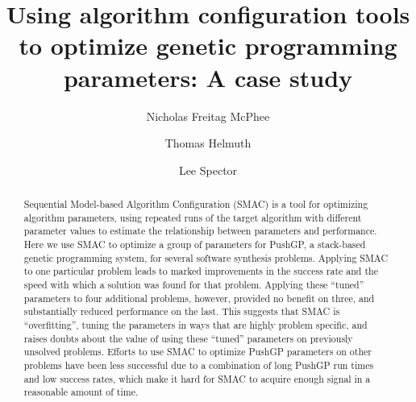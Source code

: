 \documentclass[sigconf]{acmart}
\begin{document}
\title[Using algorithm configuration tools to optimize genetic programming parameters]{Using algorithm configuration tools to optimize genetic programming parameters: A case study}

\author{Nicholas Freitag McPhee}

\author{Thomas Helmuth}

\author{Lee Spector}

\begin{abstract}
	Sequential Model-based Algorithm Configuration (SMAC) is a
	tool for optimizing algorithm parameters, using repeated runs
	of the target algorithm with different parameter values to estimate
	the relationship between parameters and performance. 
	Here we use SMAC to optimize
	a group of parameters for PushGP, a stack-based genetic programming
	system, for
	several software synthesis problems. Applying
	SMAC to one particular problem leads
	to marked improvements in the success rate and the speed with which
	a solution was found for that problem. Applying these ``tuned'' 
	parameters to four
	additional problems, however, provided no benefit on three, and
	substantially reduced performance on the last. This suggests that SMAC 
	is ``overfitting'', tuning the parameters in ways that are 
	highly problem specific, and raises doubts about the value of
	using these ``tuned'' parameters on  previously unsolved problems.
	Efforts to use SMAC to optimize PushGP parameters on other problems
	have been less successful due to a combination of long PushGP run times
	and low success rates, which make it hard for SMAC to acquire enough
	signal in a reasonable amount of time.
	
\end{abstract}
\end{document}
